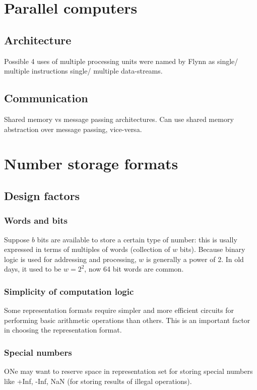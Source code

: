 \documentclass[oneside, article]{memoir}
\begin{document}
\chapter{Parallel computers}
\section{Architecture}
Possible 4 uses of multiple processing units were named by Flynn as single/ multiple instructions single/ multiple data-streams.

\section{Communication}
Shared memory vs message passing architectures. Can use shared memory abstraction over message passing, vice-versa.

\chapter{Number storage formats}
\section{Design factors}
\subsection{Words and bits}
Suppose $b$ bits are available to store a certain type of number: this is usally expressed in terms of multiples of words (collection of $w$ bits). Because binary logic is used for addressing and processing, $w$ is generally a power of 2. In old days, it used to be $w = 2^2$, now 64 bit words are common.

\subsection{Simplicity of computation logic}
Some representation formats require simpler and more efficient circuits for performing basic arithmetic operations than others. This is an important factor in choosing the representation format.

\subsection{Special numbers}
ONe may want to reserve space in representation set for storing special numbers like +Inf, -Inf, NaN (for storing results of illegal operations).
\end{document}
